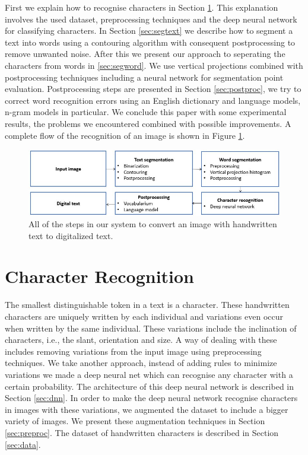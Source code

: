 \documentclass{article}
\begin{document}
First we explain how to recognise characters in Section \ref{sec:charrec}. This explanation involves the used dataset, preprocessing techniques and the deep neural network for classifying characters.
In Section \ref{sec:segtext} we describe how to segment a text into words using a contouring algorithm with consequent postprocessing to remove unwanted noise.
After this we present our approach to seperating the characters from words in \ref{sec:segword}. We use vertical projections combined with postprocessing techniques including a neural network for segmentation point evaluation.
Postprocessing steps are presented in Section \ref{sec:postproc}, we try to correct word recognition errors using an English dictionary and language models, n-gram models in particular.
We conclude this paper with some experimental results, the problems we encountered combined with possible improvements. A complete flow of the recognition of an image is shown in Figure \ref{fig:flow}.

\begin{figure}
  \centering
  \includegraphics[width=\linewidth]{images/flow_hor}
  \caption{All of the steps in our system to convert an image with handwritten text to digitalized text.}
  \label{fig:flow}
\end{figure}

\section{Character Recognition}
\label{sec:charrec}
The smallest distinguishable token in a text is a character. These handwritten characters are uniquely
written by each individual and variations even occur when written by the same individual. These variations include the inclination of characters, i.e., the slant, orientation and size.
A way of dealing with these includes removing variations from the input image using preprocessing techniques.
We take another approach, instead of adding rules to minimize variations we made a deep neural net which can recognise any character with a certain probability. The architecture of this deep neural network is described in Section \ref{sec:dnn}.
In order to make the deep neural network recognise characters in images with these variations, we augmented the dataset to include a bigger variety of images. We present these augmentation techniques in Section \ref{sec:preproc}.
The dataset of handwritten characters is described in Section \ref{sec:data}.
\end{document}
